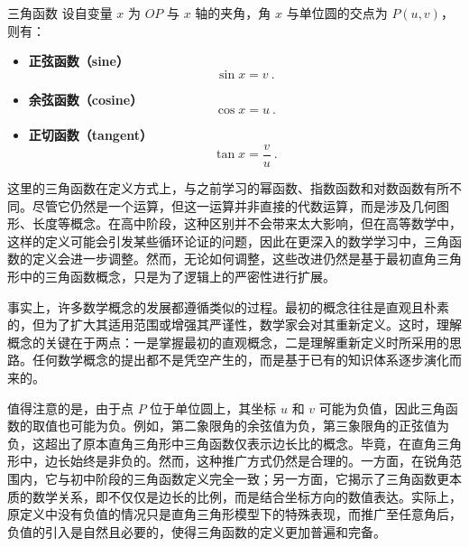 \begin{definition}{三角函数}\label{def_HsTrFu_1}
设自变量 $x$ 为 $OP$ 与 $x$ 轴的夹角，角 $x$ 与单位圆的交点为 $P(u,v)$，则有：
\begin{itemize}
\item \textbf{正弦函数（sine）}
\begin{equation}
\displaystyle\sin x = v~.
\end{equation}
\item \textbf{余弦函数（cosine）}
\begin{equation}
\displaystyle\cos x = u~.
\end{equation}
\item \textbf{正切函数（tangent）}
\begin{equation}\label{eq_HsTrFu_4}
\displaystyle\tan x = \frac{v}{u}~.
\end{equation}
\end{itemize}
\end{definition}

这里的三角函数在定义方式上，与之前学习的幂函数、指数函数和对数函数有所不同。尽管它仍然是一个运算，但这一运算并非直接的代数运算，而是涉及几何图形、长度等概念。在高中阶段，这种区别并不会带来太大影响，但在高等数学中，这样的定义可能会引发某些循环论证的问题，因此在更深入的数学学习中，三角函数的定义会进一步调整。然而，无论如何调整，这些改进仍然是基于最初直角三角形中的三角函数概念，只是为了逻辑上的严密性进行扩展。

事实上，许多数学概念的发展都遵循类似的过程。最初的概念往往是直观且朴素的，但为了扩大其适用范围或增强其严谨性，数学家会对其重新定义。这时，理解概念的关键在于两点：一是掌握最初的直观概念，二是理解重新定义时所采用的思路。任何数学概念的提出都不是凭空产生的，而是基于已有的知识体系逐步演化而来的。

值得注意的是，由于点 $P$ 位于单位圆上，其坐标 $u$ 和 $v$ 可能为负值，因此三角函数的取值也可能为负。例如，第二象限角的余弦值为负，第三象限角的正弦值为负，这超出了原本直角三角形中三角函数仅表示边长比的概念。毕竟，在直角三角形中，边长始终是非负的。然而，这种推广方式仍然是合理的。一方面，在锐角范围内，它与初中阶段的三角函数定义完全一致；另一方面，它揭示了三角函数更本质的数学关系，即不仅仅是边长的比例，而是结合坐标方向的数值表达。实际上，原定义中没有负值的情况只是直角三角形模型下的特殊表现，而推广至任意角后，负值的引入是自然且必要的，使得三角函数的定义更加普遍和完备。

